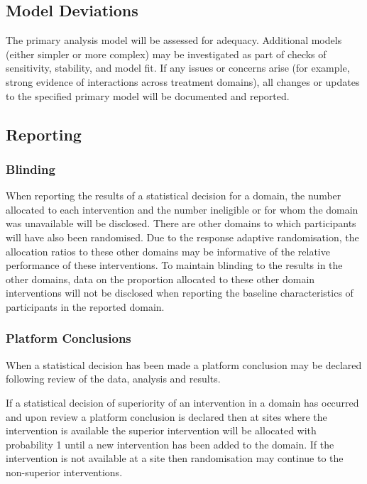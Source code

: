 \documentclass[
  11pt,
]{article}
\begin{document}
\hypertarget{model-deviations}{%
\subsection{Model Deviations}\label{model-deviations}}

The primary analysis model will be assessed for adequacy.
Additional models (either simpler or more complex) may be investigated as part of checks of sensitivity, stability, and model fit.
If any issues or concerns arise (for example, strong evidence of interactions across treatment domains), all changes or updates to the specified primary model will be documented and reported.

\hypertarget{reporting}{%
\subsection{Reporting}\label{reporting}}

\hypertarget{blinding}{%
\subsubsection{Blinding}\label{blinding}}

When reporting the results of a statistical decision for a domain, the number allocated to each intervention and the number ineligible or for whom the domain was unavailable will be disclosed. There are other domains to which participants will have also been randomised. Due to the response adaptive randomisation, the allocation ratios to these other domains may be informative of the relative performance of these interventions. To maintain blinding to the results in the other domains, data on the proportion allocated to these other domain interventions will not be disclosed when reporting the baseline characteristics of participants in the reported domain.

\hypertarget{platform-conclusions}{%
\subsubsection{Platform Conclusions}\label{platform-conclusions}}

When a statistical decision has been made a platform conclusion may be declared following review of the data, analysis and results.

If a statistical decision of superiority of an intervention in a domain has occurred and upon review a platform conclusion is declared then at sites where the intervention is available the superior intervention will be allocated with probability 1 until a new intervention has been added to the domain. If the intervention is not available at a site then randomisation may continue to the non-superior interventions.
\end{document}
